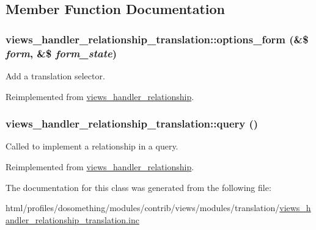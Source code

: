 \subsection{Member Function Documentation}
\hypertarget{classviews__handler__relationship__translation_aca4668f3619b0fc6182e12cbaf38b633}{
\subsubsection[{options\_\-form}]{\setlength{\rightskip}{0pt plus 5cm}views\_\-handler\_\-relationship\_\-translation::options\_\-form (\&\$ {\em form}, \/  \&\$ {\em form\_\-state})}}
\label{classviews__handler__relationship__translation_aca4668f3619b0fc6182e12cbaf38b633}
Add a translation selector. 

Reimplemented from \hyperlink{classviews__handler__relationship_a08cc3f5947964d936b5e88d198f82c30}{views\_\-handler\_\-relationship}.\hypertarget{classviews__handler__relationship__translation_af1e8ba159a9b04199ff03cad304ca1e4}{
\subsubsection[{query}]{\setlength{\rightskip}{0pt plus 5cm}views\_\-handler\_\-relationship\_\-translation::query ()}}
\label{classviews__handler__relationship__translation_af1e8ba159a9b04199ff03cad304ca1e4}
Called to implement a relationship in a query. 

Reimplemented from \hyperlink{classviews__handler__relationship_a7dc0b6371807dbf06efa594cb52b3348}{views\_\-handler\_\-relationship}.

The documentation for this class was generated from the following file:\begin{DoxyCompactItemize}
\item 
html/profiles/dosomething/modules/contrib/views/modules/translation/\hyperlink{views__handler__relationship__translation_8inc}{views\_\-handler\_\-relationship\_\-translation.inc}\end{DoxyCompactItemize}
